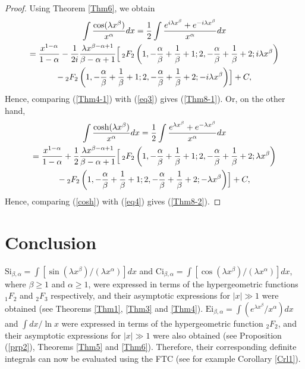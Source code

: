\documentclass[smallextended]{svjour3}
\begin{document}
\begin{proof}
Using Theorem \ref{Thm6}, we obtain
\begin{multline}
\int \frac{\cos(\lambda x^\beta)}{x^\alpha}dx=\frac{1}{2}\int\frac{e^{i\lambda x^\beta}+e^{-i\lambda x^\beta}}{x^\alpha}dx
\\=\frac{x^{1-\alpha}}{1-\alpha}-\frac{1}{2i}\frac{\lambda x^{\beta-\alpha+1}}{\beta-\alpha+1}\Bigl[ \hspace{.075cm}_{2}F_{2}\left(1,-\frac{\alpha}{\beta}+\frac{1}{\beta}+1;2,-\frac{\alpha}{\beta}+\frac{1}{\beta}+2;i\lambda x^\beta\right)\\- \hspace{.075cm}_{2}F_{2}\left(1,-\frac{\alpha}{\beta}+\frac{1}{\beta}+1;2,-\frac{\alpha}{\beta}+\frac{1}{\beta}+2;-i\lambda x^\beta\right)\Bigr]+C,
\label{eq3}
\end{multline}
Hence, comparing (\ref{Thm4-1}) with (\ref{eq3}) gives (\ref{Thm8-1}).
Or, on the other hand,
\begin{multline}
\int \frac{\cosh(\lambda x^\beta)}{x^\alpha}dx=\frac{1}{2}\int\frac{e^{\lambda x^\beta}+e^{-\lambda x^\beta}}{x^\alpha}dx
\\=\frac{x^{1-\alpha}}{1-\alpha}+\frac{1}{2}\frac{\lambda x^{\beta-\alpha+1}}{\beta-\alpha+1}\Bigl[ \hspace{.075cm}_{2}F_{2}\left(1,-\frac{\alpha}{\beta}+\frac{1}{\beta}+1;2,-\frac{\alpha}{\beta}+\frac{1}{\beta}+2;\lambda x^\beta\right)\\- \hspace{.075cm}_{2}F_{2}\left(1,-\frac{\alpha}{\beta}+\frac{1}{\beta}+1;2,-\frac{\alpha}{\beta}+\frac{1}{\beta}+2;-\lambda x^\beta\right)\Bigr]+C,
\label{eq4}
\end{multline}
Hence, comparing (\ref{cosh}) with (\ref{eq4}) gives (\ref{Thm8-2}).
\end{proof}


\section{Conclusion}\label{conclusion}
$\text{Si}_{\beta,\alpha}=\int [\sin{(\lambda x^\beta)}/{(\lambda x^\alpha)}] dx$ and $\text{Ci}_{\beta,\alpha}=\int [\cos{(\lambda x^\beta)}/{(\lambda x^\alpha)}] dx$, where $\beta\ge1$ and $\alpha\ge 1$, were expressed in terms of the hypergeometric functions ${}_1F_2$ and ${}_2F_3$ respectively, and their asymptotic expressions for $|x|\gg1$ were obtained (see Theorems \ref{Thm1}, \ref{Thm3} and \ref{Thm4}).
$\text{Ei}_{\beta,\alpha}=\int (e^{\lambda x^\beta}/x^\alpha)dx$ and $\int dx/\ln{x}$ were expressed in terms of the hypergeometric function ${}_2F_2$, and their asymptotic expressions for $|x|\gg1$ were also obtained (see Proposition (\ref{prp2}), Theorems \ref{Thm5} and  \ref{Thm6}). Therefore, their corresponding definite integrals can now be evaluated using the FTC (see for example Corollary \ref{Crl1}).
\end{document}
